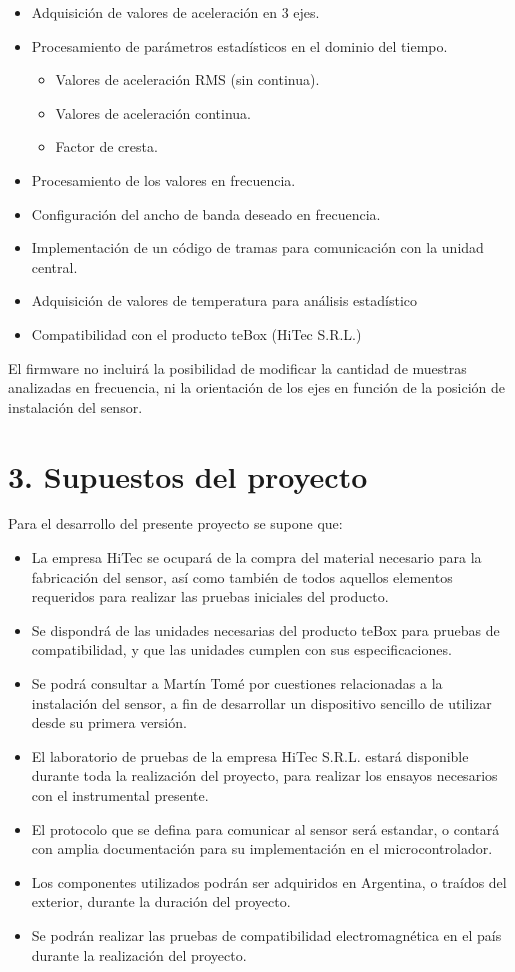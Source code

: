 \documentclass[11pt]{charter}
\begin{document}
\begin{itemize}
\item Adquisición de valores de aceleración en 3 ejes.
\item Procesamiento de parámetros estadísticos en el dominio del tiempo.
	\begin{itemize}
	\item Valores de aceleración RMS (sin continua).
	\item Valores de aceleración continua.
	\item Factor de cresta.
	\end{itemize}
\item Procesamiento de los valores en frecuencia.
\item Configuración del ancho de banda deseado en frecuencia.
\item Implementación de un código de tramas para comunicación con la unidad central.
\item Adquisición de valores de temperatura para análisis estadístico
\item Compatibilidad con el producto teBox (HiTec S.R.L.)
\end{itemize}

El firmware no incluirá la posibilidad de modificar la cantidad de muestras analizadas en frecuencia, ni la orientación de los ejes en función de la posición de instalación del sensor.

\section{3. Supuestos del proyecto}
\label{sec:supuestos}

Para el desarrollo del presente proyecto se supone que:

\begin{itemize}
\item La empresa HiTec se ocupará de la compra del material necesario para la fabricación del sensor, así como también de todos aquellos elementos requeridos para realizar las pruebas iniciales del producto.
\item Se dispondrá de las unidades necesarias del producto teBox para pruebas de compatibilidad, y que las unidades cumplen con sus especificaciones.
\item Se podrá consultar a Martín Tomé por cuestiones relacionadas a la instalación del sensor, a fin de desarrollar un dispositivo sencillo de utilizar desde su primera versión.
\item El laboratorio de pruebas de la empresa HiTec S.R.L. estará disponible durante toda la realización del proyecto, para realizar los ensayos necesarios con el instrumental presente.
\item El protocolo que se defina para comunicar al sensor será estandar, o contará con amplia documentación para su implementación en el microcontrolador.
\item Los componentes utilizados podrán ser adquiridos en Argentina, o traídos del exterior, durante la duración del proyecto.
\item Se podrán realizar las pruebas de compatibilidad electromagnética en el país durante la realización del proyecto.
\end{itemize}
\end{document}
